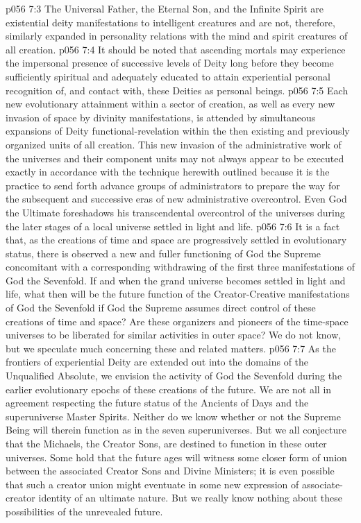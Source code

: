 \vs p056 7:3 \pc The Universal Father, the Eternal Son, and the Infinite Spirit are existential deity manifestations to intelligent creatures and are not, therefore, similarly expanded in personality relations with the mind and spirit creatures of all creation.
\vs p056 7:4 \pc It should be noted that ascending mortals may experience the impersonal presence of successive levels of Deity long before they become sufficiently spiritual and adequately educated to attain experiential personal recognition of, and contact with, these Deities as personal beings.
\vs p056 7:5 Each new evolutionary attainment within a sector of creation, as well as every new invasion of space by divinity manifestations, is attended by simultaneous expansions of Deity functional\hyp{}revelation within the then existing and previously organized units of all creation. This new invasion of the administrative work of the universes and their component units may not always appear to be executed exactly in accordance with the technique herewith outlined because it is the practice to send forth advance groups of administrators to prepare the way for the subsequent and successive eras of new administrative overcontrol. Even God the Ultimate foreshadows his transcendental overcontrol of the universes during the later stages of a local universe settled in light and life.
\vs p056 7:6 It is a fact that, as the creations of time and space are progressively settled in evolutionary status, there is observed a new and fuller functioning of God the Supreme concomitant with a corresponding withdrawing of the first three manifestations of God the Sevenfold. If and when the grand universe becomes settled in light and life, what then will be the future function of the Creator\hyp{}Creative manifestations of God the Sevenfold if God the Supreme assumes direct control of these creations of time and space? Are these organizers and pioneers of the time\hyp{}space universes to be liberated for similar activities in outer space? We do not know, but we speculate much concerning these and related matters.
\vs p056 7:7 \pc As the frontiers of experiential Deity are extended out into the domains of the Unqualified Absolute, we envision the activity of God the Sevenfold during the earlier evolutionary epochs of these creations of the future. We are not all in agreement respecting the future status of the Ancients of Days and the superuniverse Master Spirits. Neither do we know whether or not the Supreme Being will therein function as in the seven superuniverses. But we all conjecture that the Michaels, the Creator Sons, are destined to function in these outer universes. Some hold that the future ages will witness some closer form of union between the associated Creator Sons and Divine Ministers; it is even possible that such a creator union might eventuate in some new expression of associate\hyp{}creator identity of an ultimate nature. But we really know nothing about these possibilities of the unrevealed future.
